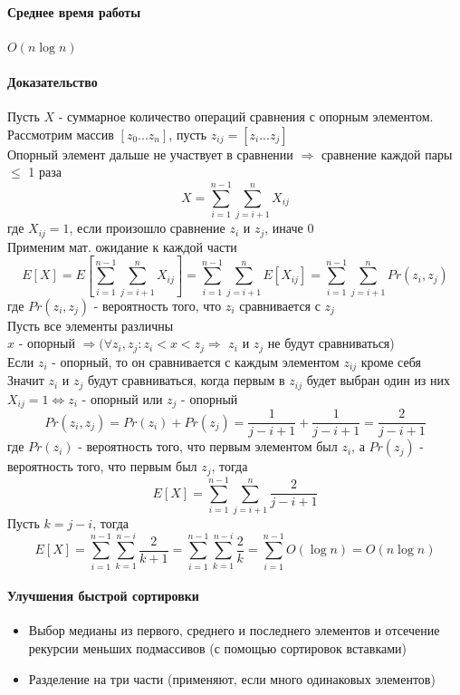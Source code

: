 \documentclass[a4paper,10pt]{article}
\begin{document}
	\paragraph{Среднее время работы}
	$O(n\log{n})$
	\paragraph{Доказательство}
	Пусть $X$ - суммарное количество операций сравнения с опорным элементом. Рассмотрим массив
	$[z_{0}...z_{n}]$, пусть $z_{ij} = [z_{i}...z_{j}]$ \\
	Опорный элемент дальше не участвует в сравнении $\Rightarrow$ сравнение каждой пары $\leq$ 1 раза \\
	\[
	X = \sum_{i=1}^{n-1} \sum_{j=i+1}^{n} X_{ij}
	\] 
	где $X_{ij} = 1$, если произошло сравнение $z_{i}$ и $z_{j}$, иначе 0 \\
	Применим мат. ожидание к каждой части
	\[ 
	E[X] = E[\sum_{i=1}^{n-1} \sum_{j=i+1}^{n} X_{ij}] = \sum_{i=1}^{n-1} \sum_{j=i+1}^{n} E[X_{ij}] = \sum_{i=1}^{n-1} \sum_{j=i+1}^{n} Pr(z_{i}, z_{j})
	\]		
	где $Pr(z_{i}, z_{j})$ - вероятность того, что $z_{i}$ сравнивается с $z_{j}$ \\
	Пусть все элементы различны \\
	$x$ - опорный $\Rightarrow (\forall z_{i}, z_{j} \colon z_{i} < x < z_{j} \Rightarrow$ $z_{i}$ и $z_{j}$ не будут сравниваться)  \\
	Если $z_{i}$ - опорный, то он сравнивается с каждым элементом $z_{ij}$ кроме себя \\
	Значит $z_{i}$ и $z_{j}$ будут сравниваться, когда первым в $z_{ij}$ будет выбран один из них \\
	$X_{ij} = 1 \Leftrightarrow z_{i}$ - опорный или $z_{j}$ - опорный
	\[ 
	Pr(z_{i}, z_{j}) = Pr(z_{i}) + Pr(z_{j}) = \frac{1}{j-i+1} + \frac{1}{j-i+1} = \frac{2}{j-i+1}
	\]
	где $Pr(z_{i})$ - вероятность того, что первым элементом был $z_{i}$, а $Pr(z_{j})$ - вероятность того, что первым был $z_{j}$, тогда
	\[
	E[X] =  \sum_{i=1}^{n-1} \sum_{j=i+1}^{n} \frac{2}{j-i+1}
	\]
	Пусть $k = j - i$, тогда
	\[
	E[X] =  \sum_{i=1}^{n-1} \sum_{k=1}^{n-i} \frac{2}{k+1} = \sum_{i=1}^{n-1} \sum_{k=1}^{n-i} \frac{2}{k} = \sum_{i=1}^{n-1} O(\log{n}) = O(n\log{n})
	\]
	\paragraph{Улучшения быстрой сортировки}
	\begin{itemize}
		\item Выбор медианы из первого, среднего и последнего элементов и отсечение рекурсии меньших подмассивов (с помощью сортировок вставками)
		\item Разделение на три части (применяют, если много одинаковых элементов)
	\end{itemize}
\end{document}
